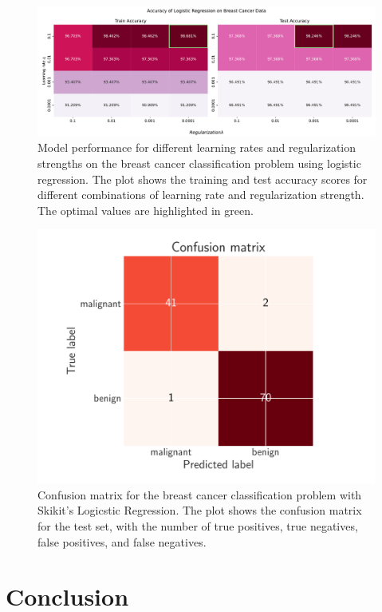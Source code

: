 \documentclass[aps,pra,english,notitlepage,reprint,nofootinbib]{revtex4-1}  %
\begin{document}
\begin{onecolumngrid}
    \begin{figure}[h!]
        \centering
        \includegraphics[width = .9\textwidth]{../figs/logistic_regression_gridsearch.pdf}
        \caption{Model performance for different learning rates and regularization strengths on the breast cancer classification problem using logistic regression. The plot shows the training and test accuracy scores for different combinations of learning rate and regularization strength. The optimal values are highlighted in green.}
    \end{figure}
\end{onecolumngrid}


\begin{figure}[h!]
    \includegraphics[width =.45\textwidth]{../figs/confusion_matrix.pdf}
    \caption{Confusion matrix for the breast cancer classification problem with Skikit's Logicstic Regression. The plot shows the confusion matrix for the test set, with the number of true positives, true negatives, false positives, and false negatives.}
    \label{fig:confusion_matrix}
\end{figure}


\section{Conclusion}\label{sec:conclusion}

\end{document}
